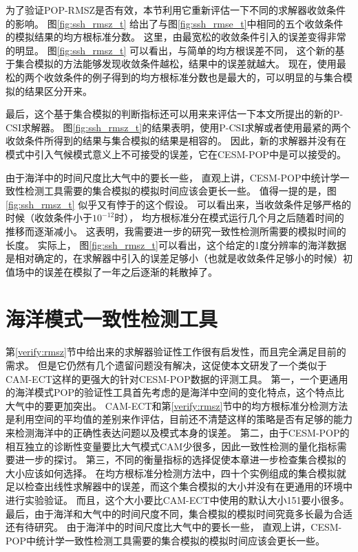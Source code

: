 为了验证POP-RMSZ是否有效，本节利用它重新评估一下不同的求解器收敛条件的影响。
图\ref{fig:ssh_rmsz_t} 给出了与图\ref{fig:ssh_rmse_t}中相同的五个收敛条件的模拟结果的均方根标准分数。
这里，由最宽松的收敛条件引入的误差变得非常的明显。  
图\ref{fig:ssh_rmsz_t} 可以看出，与简单的均方根误差不同， 这个新的基于集合模拟的方法能够发现收敛条件越松，结果中的误差就越大。 
现在，使用最松的两个收敛条件的例子得到的均方根标准分数也是最大的，可以明显的与集合模拟的结果区分开来。 

最后，这个基于集合模拟的判断指标还可以用来来评估一下本文所提出的新的P-CSI求解器。 图\ref{fig:ssh_rmsz_t}的结果表明，使用P-CSI求解或者使用最紧的两个收敛条件所得到的结果与集合模拟的结果是相容的。 
因此，新的求解器并没有在模式中引入气候模式意义上不可接受的误差，它在CESM-POP中是可以接受的。  
 
由于海洋中的时间尺度比大气中的要长一些， 直观上讲，CESM-POP中统计学一致性检测工具需要的集合模拟的模拟时间应该会更长一些。 
值得一提的是，图\ref{fig:ssh_rmsz_t} 似乎又有悖于的这个假设。 
可以看出来，当收敛条件足够严格的时候（收敛条件小于$10^{-12}$时）， 均方根标准分在模式运行几个月之后随着时间的推移而逐渐减小。
这表明，我需要进一步的研究一致性检测所需要的模拟时间的长度。 
实际上， 图\ref{fig:ssh_rmsz_t}可以看出，这个给定的1度分辨率的海洋数据是相对确定的，在求解器中引入的误差足够小（也就是收敛条件足够小的时候）初值场中的误差在模拟了一年之后逐渐的耗散掉了。



\section{海洋模式一致性检测工具}\label{verify:ECT}


第\ref{verify:rmsz}节中给出来的求解器验证性工作很有启发性，而且完全满足目前的需求。 
但是它仍然有几个遗留问题没有解决，这促使本文研发了一个类似于CAM-ECT这样的更强大的针对CESM-POP数据的评测工具。 
第一，一个更通用的海洋模式POP的验证性工具首先考虑的是海洋中空间的变化特点，这个特点比大气中的要更加突出。
CAM-ECT和第\ref{verify:rmsz}节中的均方根标准分检测方法是利用空间的平均值的差别来作评估，目前还不清楚这样的策略是否有足够的能力来检测海洋中的正确性表达问题以及模式本身的误差。
第二，由于CESM-POP的相互独立的诊断性变量要比大气模式CAM少很多，因此一致性检测的量化指标需要进一步的探讨。
第三，不同的衡量指标的选择促使本章进一步检查集合模拟的大小应该如何选择。
在均方根标准分检测方法中，四十个实例组成的集合模拟就足以检查出线性求解器中的误差，而这个集合模拟的大小并没有在更通用的环境中进行实验验证。
而且，这个大小要比CAM-ECT中使用的默认大小151要小很多。
最后，由于海洋和大气中的时间尺度不同，集合模拟的模拟时间究竟多长最为合适还有待研究。 
由于海洋中的时间尺度比大气中的要长一些， 直观上讲，CESM-POP中统计学一致性检测工具需要的集合模拟的模拟时间应该会更长一些。 
 
